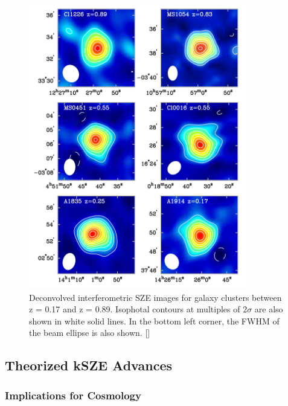 \documentclass[manuscript]{aastex}
\begin{document}
\newpage
\begin{figure}[h!]
\centering
\captionsetup{width=0.85\textwidth}
\includegraphics[width=0.85\textwidth]{carlstrom1.png}
\caption[An example of the redshift independence of SZE measurements for six different clusters. -(\cite{Carlstrom2002})]{Deconvolved interferometric SZE images for galaxy clusters between z = 0.17 and z = 0.89. Isophotal contours at multiples of \(2\sigma\) are also shown in white solid lines. In the bottom left corner, the FWHM of the beam ellipse is also shown. [\cite{Carlstrom2002}]}
\end{figure}

\subsection{Theorized kSZE Advances}

\subsubsection{Implications for Cosmology}

\end{document}
